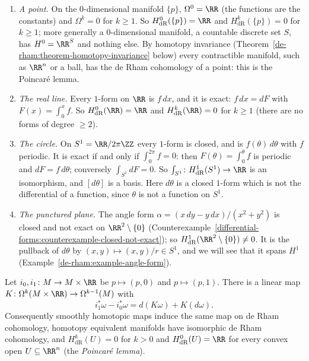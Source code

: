 \begin{example}\label{de-rham:example-first-computations}
\begin{enumerate}
\item \emph{A point.} On the $0$-dimensional manifold $\{p\}$, $\Omega^0 = \RR$ (the functions are the constants) and $\Omega^k = 0$ for $k \geq 1$. So $H^0_{\mathrm{dR}}(\{p\}) = \RR$ and
$H^k_{\mathrm{dR}}(\{p\}) = 0$ for $k \geq 1$; more generally a $0$-dimensional manifold, a countable discrete set $S$, has $H^0 = \RR^S$ and nothing else. By homotopy invariance
(Theorem~\ref{de-rham:theorem-homotopy-invariance} below) every contractible manifold, such as $\RR^n$ or a ball, has the de Rham cohomology of a point: this is the Poincar\'e lemma.
\item \emph{The real line.} Every $1$-form on $\RR$ is $f\,dx$, and it is exact: $f\,dx = dF$ with $F(x) = \int_0^xf$. So $H^0_{\mathrm{dR}}(\RR) = \RR$ and $H^k_{\mathrm{dR}}(\RR) = 0$ for
$k \geq 1$ (there are no forms of degree $\geq 2$).
\item \emph{The circle.} On $S^1 = \RR/2\pi\ZZ$ every $1$-form is closed, and is $f(\theta)\,d\theta$ with $f$ periodic. It is exact if and only if $\int_0^{2\pi}f = 0$: then
$F(\theta) = \int_0^\theta f$ is periodic and $dF = f\,d\theta$; conversely $\int_{S^1}dF = 0$. So $\int_{S^1} \colon H^1_{\mathrm{dR}}(S^1) \to \RR$ is an isomorphism, and $[d\theta]$ is a basis.
Here $d\theta$ is a closed $1$-form which is not the differential of a function, since $\theta$ is not a function on $S^1$.
\item \emph{The punctured plane.} The angle form $\alpha = (x\,dy - y\,dx)/(x^2 + y^2)$ is closed and not exact on $\RR^2 \setminus \{0\}$
(Counterexample~\ref{differential-forms:counterexample-closed-not-exact}); so $H^1_{\mathrm{dR}}(\RR^2 \setminus \{0\}) \neq 0$. It is the pullback of $d\theta$ by
$(x, y) \mapsto (x, y)/r \in S^1$, and we will see that it spans $H^1$ (Example~\ref{de-rham:example-angle-form}).
\end{enumerate}
\end{example}

\begin{theorem}\label{de-rham:theorem-homotopy-invariance}
Let $i_0, i_1 \colon M \to M \times \RR$ be $p \mapsto (p, 0)$ and $p \mapsto (p, 1)$. There is a linear map $K \colon \Omega^k(M \times \RR) \to \Omega^{k-1}(M)$ with
\[
i_1^*\omega - i_0^*\omega = d(K\omega) + K(d\omega).
\]
Consequently smoothly homotopic maps induce the same map on de Rham cohomology, homotopy equivalent manifolds have isomorphic de Rham cohomology, and $H^k_{\mathrm{dR}}(U) = 0$ for $k > 0$ and
$H^0_{\mathrm{dR}}(U) = \RR$ for every convex open $U \subseteq \RR^n$ (the \emph{Poincar\'e lemma}).
\end{theorem}

